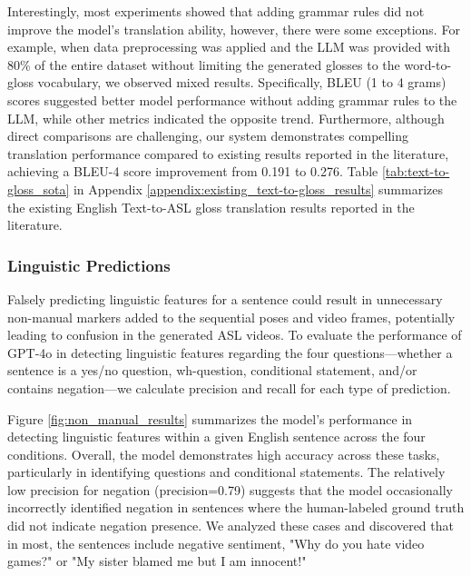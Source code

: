 Interestingly, most experiments showed that adding grammar rules did not improve the model’s translation ability, however, there were some exceptions. 
For example, when data preprocessing was applied and the LLM was provided with 80\% of the entire dataset without limiting the generated glosses to the word-to-gloss vocabulary, we observed mixed results. Specifically, BLEU (1 to 4 grams) scores suggested better model performance without adding grammar rules to the LLM, while other metrics indicated the opposite trend. Furthermore, although direct comparisons are challenging, our system demonstrates compelling translation performance compared to existing results reported in the literature, achieving a BLEU-4 score improvement from 0.191 to 0.276. Table \ref{tab:text-to-gloss_sota} in Appendix \ref{appendix:existing_text-to-gloss_results} summarizes the existing English Text-to-ASL gloss translation results reported in the literature.

\subsubsection{Linguistic Predictions}\label{subsubsec:linguistic_predictions}

Falsely predicting linguistic features for a sentence could result in unnecessary non-manual markers added to the sequential poses and video frames, potentially leading to confusion in the generated ASL videos. To evaluate the performance of GPT-4o in detecting linguistic features regarding the four questions---whether a sentence is a yes/no question, wh-question, conditional statement, and/or contains negation---we calculate precision and recall for each type of prediction. 

Figure \ref{fig:non_manual_results} summarizes the model’s performance in detecting linguistic features within a given English sentence across the four conditions. Overall, the model demonstrates high accuracy across these tasks, particularly in identifying questions and conditional statements. The relatively low precision for negation (precision=0.79) suggests that the model occasionally incorrectly identified negation in sentences where the human-labeled ground truth did not indicate negation presence. We analyzed these cases and discovered that in most, the sentences include negative sentiment, \eg "Why do you hate video games?" or "My sister blamed me but I am innocent!"  


